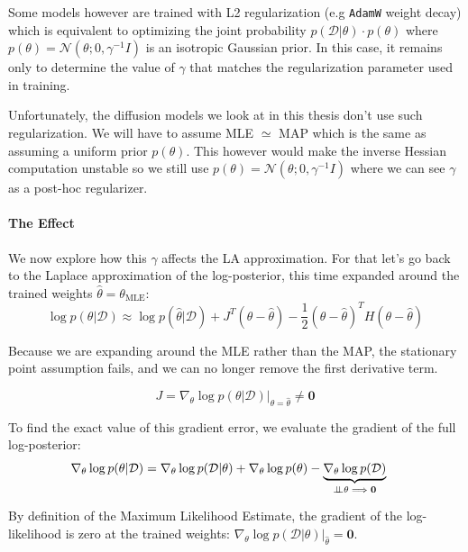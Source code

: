 Some models however are trained with L2 regularization (e.g \texttt{AdamW} weight decay) which is equivalent to optimizing the joint probability $p(\mathcal{D}|\theta)\cdot p(\theta)$ where $p(\theta) = \mathcal{N}(\theta; 0, \gamma^{-1}I)$ is an isotropic Gaussian prior. In this case, it remains only to determine the value of $\gamma$ that matches the regularization parameter used in training.

Unfortunately, the diffusion models we look at in this thesis don't use such regularization. We will have to assume \acs{MLE} $\simeq$ \acs{MAP} which is the same as assuming a uniform prior $p(\theta)$. This however would make the inverse Hessian computation unstable so we still use $p(\theta) = \mathcal{N}(\theta; 0, \gamma^{-1}I)$ where we can see $\gamma$ as a post-hoc regularizer.

\paragraph{The Effect}
We now explore how this $\gamma$ affects the \acs{LA} approximation. For that let's go back to the Laplace approximation of the log-posterior, this time expanded around the trained weights $\hat\theta = \theta_{\mathrm{MLE}}$:
\begin{equation}
\log p(\theta | \mathcal{D}) \approx \log p(\hat\theta|\mathcal{D}) + J^T(\theta - \hat\theta) - \frac{1}{2}(\theta - \hat\theta)^T H (\theta - \hat\theta)
\end{equation}

Because we are expanding around the \acs{MLE} rather than the \acs{MAP}, the stationary point assumption fails, and we can no longer remove the first derivative term.

\begin{equation}
J = \left. \nabla_\theta \log p(\theta|\mathcal{D}) \right|_{\theta=\hat\theta} \not= \mathbf{0}
\end{equation}

To find the exact value of this gradient error, we evaluate the gradient of the full log-posterior:
\begin{align}
\nabla_\theta \log p(\theta|\mathcal{D}) &= \nabla_\theta \log p(\mathcal{D}|\theta) + \nabla_\theta \log p(\theta) - \underbrace{\nabla_\theta \log p(\mathcal{D})}_{\perp\!\!\!\perp \theta \implies \mathbf{0}}
\end{align}

By definition of the Maximum Likelihood Estimate, the gradient of the log-likelihood is zero at the trained weights: $\left. \nabla_\theta \log p(\mathcal{D}|\theta) \right|_{\hat\theta} = \mathbf{0}$. 

